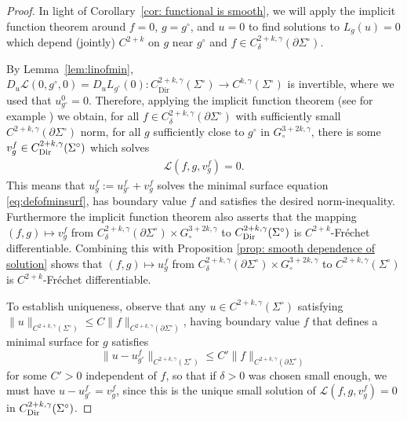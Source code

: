 \documentclass[11pt]{amsart}
\theoremstyle{definition}
\numberwithin{equation}{section}
\newcommand{\norm}[1]{\lVert #1 \rVert}         %
\newcommand{\p}{\partial}
\begin{document}
\begin{proof}%
In light of Corollary~\ref{cor: functional is smooth}, we will apply the implicit function theorem around $f = 0$, $g = g^\circ$, and $u = 0$ to find solutions to $L_{g}(u)  =0$ which depend (jointly) $C^{2+k}$ on $g$ near $g^\circ$ and $f \in C^{2+k,\gamma}_{\delta}(\partial\Sigma^\circ)$.

By Lemma~\ref{lem:linofmin}, $D_u\mathcal{L}(0,g^\circ,0) = D_u L_{g^\circ}(0) \colon C^{2+k,\gamma}_{\mathrm{Dir}}(\Sigma^\circ)\to C^{k,\gamma}(\Sigma^\circ)$ is invertible, where we used that $u^0_{g^\circ}=0$.  
Therefore, applying the implicit function theorem (see for example \cite[Thm.~2.5.7]{MR960687}) we obtain, for all $f \in  C^{2+k,\gamma}_{\delta}(\partial\Sigma^\circ)$ with sufficiently small $C^{2+k,\gamma}(\partial \Sigma^\circ)$ norm, for all $g$ sufficiently close to $g^\circ$ in $G^{3+2k,\gamma}_\circ$, there is some $v^f_{g}\in C^{2+k,\gamma}_{\rm Dir}(\Sigma^\circ)$ which solves
\begin{eqnarray}\label{eq: result of IFT}
\mathcal L(f, g, v^f_{g}) = 0.
\end{eqnarray}
This means that $u_{g}^f := u_{g^\circ}^f + v_{g}^f$ solves the minimal surface equation \eqref{eq:defofminsurf}, has boundary value $f$ and satisfies the desired norm-inequality. Furthermore the implicit function theorem also asserts that the mapping  $(f,g) \mapsto v^f_{g}$ from $C^{2+k,\gamma}_{\delta}(\partial\Sigma^\circ)\times G^{3+2k,\gamma}_\circ$ to $C^{2+k,\gamma}_{\rm Dir}(\Sigma^\circ)$ is $C^{2+k}$-Fr\'echet differentiable. Combining this with Proposition \ref{prop: smooth dependence of solution} shows that $(f,g) \mapsto u^f_{g}$ from $C^{2+k,\gamma}_{\delta}(\partial\Sigma^\circ)\times G^{3+2k,\gamma}_\circ$ to $C^{2+k,\gamma}(\Sigma^\circ)$ is $C^{2+k}$-Fr\'echet differentiable.

To establish uniqueness, observe that any $u \in C^{2+k,\gamma}(\Sigma^\circ)$ satisfying $\norm{u}_{C^{2+k,\gamma}(\Sigma^\circ)}\leq C\norm{f}_{C^{2+k,\gamma}(\p\Sigma^\circ)}$, having boundary value $f$ that defines a minimal surface for $g$ satisfies
\[
    \norm{u-u^{f}_{g^\circ}}_{C^{2+k,\gamma}(\Sigma^\circ)} \leq C'\norm{f}_{C^{2+k,\gamma}(\p\Sigma^\circ)}
\]
for some $C'>0$ independent of $f$, so that if $\delta>0$ was chosen small enough, we must have $u-u^{f}_{g^\circ}=v^{f}_{g}$, since this is the unique small solution of $\mathcal{L}(f,g,v^{f}_{g})=0$ in $C_{\rm{Dir}}^{2+k,\gamma}(\Sigma^\circ)$.
\end{proof}
\end{document}
